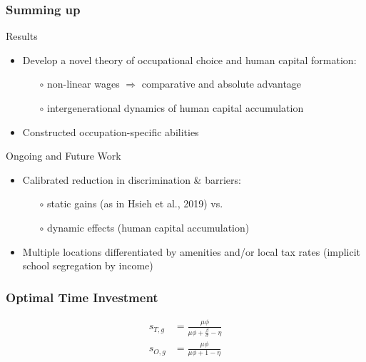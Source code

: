 \documentclass[11pt]{beamer}
\begin{document}
			
		
		\begin{frame}
			\frametitle{Summing up}
			\textcolor{tblue}{Results}
			\begin{itemize}
				\item Develop a novel theory of occupational choice and human capital formation: 
				\begin{itemize}
					\item[$\circ$] non-linear wages $\Rightarrow$ comparative and absolute advantage
					\item[$\circ$] intergenerational dynamics of human capital accumulation
				\end{itemize}
				\item Constructed occupation-specific abilities 
			\end{itemize}
			\vfill
			\textcolor{tblue}{Ongoing and Future Work}
			\begin{itemize}
				\item Calibrated reduction in discrimination \& barriers:
				\begin{itemize}
					\item[$\circ$] static gains (as in Hsieh et al., 2019) vs.
					\item[$\circ$] dynamic effects (human capital accumulation)
				\end{itemize}
				\item Multiple locations differentiated by amenities and/or local tax rates (implicit school segregation by income)
			\end{itemize}
		\end{frame}
		
		
		\begin{frame}
			\frametitle{Optimal Time Investment} 
			\label{time_inv}
			\begin{align}
				s_{T,g} & = \frac{\mu \phi}{\mu \phi+\tfrac{\beta}{\sigma}-\eta} \nonumber\\
				s_{O,g} & = \frac{\mu \phi}{\mu \phi+1-\eta} \nonumber
			\end{align}
			\hyperlink{eqm}{\beamergotobutton{Back}}
		\end{frame}
		
\end{document}
